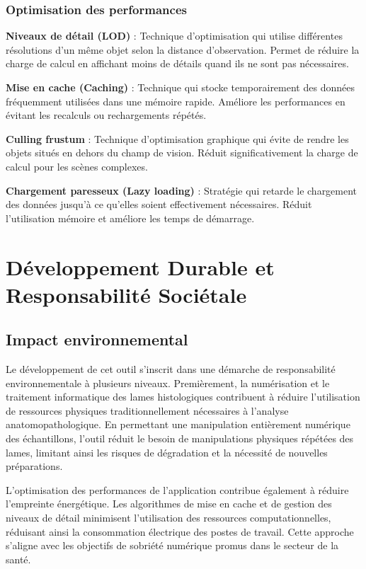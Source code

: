 \documentclass[12pt,a4paper]{report}
\begin{document}
\subsection{Optimisation des performances}

\textbf{Niveaux de détail (LOD)} : Technique d'optimisation qui utilise différentes résolutions d'un même objet selon la distance d'observation. Permet de réduire la charge de calcul en affichant moins de détails quand ils ne sont pas nécessaires.

\textbf{Mise en cache (Caching)} : Technique qui stocke temporairement des données fréquemment utilisées dans une mémoire rapide. Améliore les performances en évitant les recalculs ou rechargements répétés.

\textbf{Culling frustum} : Technique d'optimisation graphique qui évite de rendre les objets situés en dehors du champ de vision. Réduit significativement la charge de calcul pour les scènes complexes.

\textbf{Chargement paresseux (Lazy loading)} : Stratégie qui retarde le chargement des données jusqu'à ce qu'elles soient effectivement nécessaires. Réduit l'utilisation mémoire et améliore les temps de démarrage.

\chapter{Développement Durable et Responsabilité Sociétale}

\section{Impact environnemental}

Le développement de cet outil s'inscrit dans une démarche de responsabilité environnementale à plusieurs niveaux. Premièrement, la numérisation et le traitement informatique des lames histologiques contribuent à réduire l'utilisation de ressources physiques traditionnellement nécessaires à l'analyse anatomopathologique. En permettant une manipulation entièrement numérique des échantillons, l'outil réduit le besoin de manipulations physiques répétées des lames, limitant ainsi les risques de dégradation et la nécessité de nouvelles préparations.

L'optimisation des performances de l'application contribue également à réduire l'empreinte énergétique. Les algorithmes de mise en cache et de gestion des niveaux de détail minimisent l'utilisation des ressources computationnelles, réduisant ainsi la consommation électrique des postes de travail. Cette approche s'aligne avec les objectifs de sobriété numérique promus dans le secteur de la santé.
\end{document}
